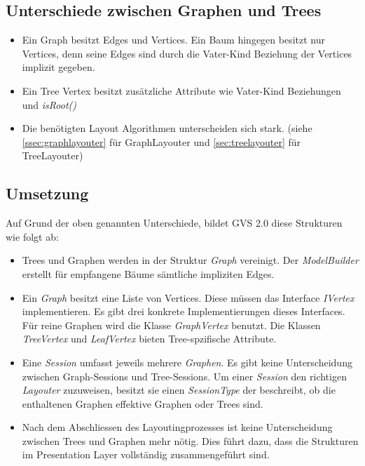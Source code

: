 \documentclass[11pt,a4paper,english,oneside]{book}
\numberwithin{equation}{chapter}
\begin{document}
	\subsection{Unterschiede zwischen Graphen und Trees}
	\begin{itemize}
		\item Ein Graph besitzt Edges und Vertices. Ein Baum hingegen besitzt nur Vertices, denn seine Edges sind durch die Vater-Kind Beziehung der Vertices implizit gegeben. 
		\item Ein Tree Vertex besitzt zusätzliche Attribute wie Vater-Kind Beziehungen und \textit{isRoot()}
		\item Die benötigten Layout Algorithmen unterscheiden sich stark. (siehe \ref{ssec:graphlayouter} für GraphLayouter und \ref{sec:treelayouter} für TreeLayouter)
	\end{itemize}
	
	\subsection{Umsetzung}
	Auf Grund der oben genannten Unterschiede, bildet GVS 2.0 diese Strukturen wie folgt ab:
	
	\begin{itemize}
		\item Trees und Graphen werden in der Struktur \textit{Graph} vereinigt. Der \textit{ModelBuilder} erstellt für empfangene Bäume sämtliche impliziten Edges.
		\item Ein \textit{Graph} besitzt eine Liste von Vertices. Diese müssen das Interface \textit{IVertex} implementieren. Es gibt drei konkrete Implementierungen dieses Interfaces. Für reine Graphen wird die Klasse \textit{GraphVertex} benutzt. Die Klassen \textit{TreeVertex} und \textit{LeafVertex} bieten Tree-spzifische Attribute.
		\item Eine \textit{Session} umfasst jeweils mehrere \textit{Graphen}. Es gibt keine Unterscheidung zwischen Graph-Sessions und Tree-Sessions. Um einer \textit{Session} den richtigen \textit{Layouter} zuzuweisen, besitzt sie einen \textit{SessionType} der beschreibt, ob die enthaltenen Graphen effektive Graphen oder Trees sind.
		\item Nach dem Abschliessen des Layoutingprozesses ist keine Unterscheidung zwischen Trees und Graphen mehr nötig. Dies führt dazu, dass die Strukturen im Presentation Layer vollständig zusammengeführt sind.
	\end{itemize}

	
	
\end{document}
